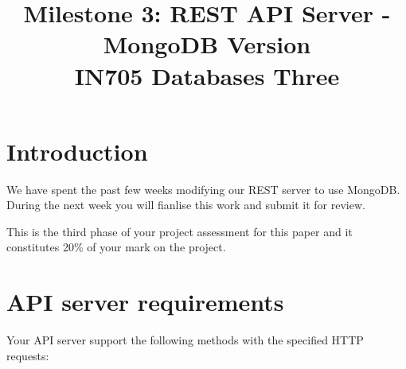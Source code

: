 \documentclass{article}
\begin{document}
\title{Milestone 3: REST API Server - MongoDB Version\\ IN705 Databases Three}
\date{}
\maketitle

\section*{Introduction}
We have spent the past few weeks modifying our REST server to use MongoDB.  During the next week you will fianlise this work and submit it for review.  

This is the third phase of your project assessment for this paper and it constitutes 20\% of your mark on the project.

\section{API server requirements}
Your API server support the following methods with the specified HTTP requests:
\end{document}

